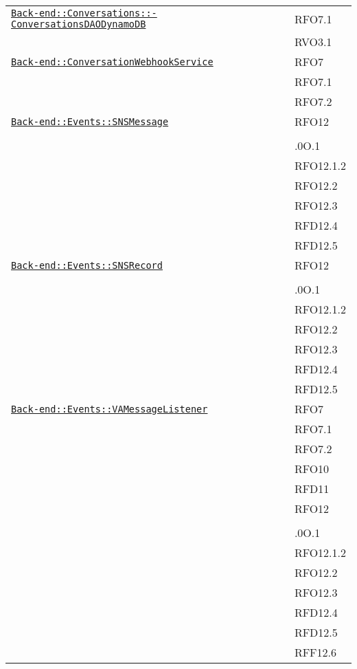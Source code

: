 \begin{longtable}{|>{\centering}m{10cm}|m{3cm}<{\centering}|}
\hyperref[Back-end::Conversations::ConversationsDAODynamoDB]{\texttt{Back-end::Conversations::-\linebreak ConversationsDAODynamoDB}} & RFO7.1\\
& RVO3.1\\ \hline

\hyperref[Back-end::ConversationWebhookService]{\texttt{Back-end::ConversationWebhookService}} & RFO7\\
& RFO7.1\\
& RFO7.2\\ \hline

\hyperref[Back-end::Events::SNSMessage]{\texttt{Back-end::Events::SNSMessage}} & RFO12\\
& \\
& .0O.1\\
& RFO12.1.2\\
& RFO12.2\\
& RFO12.3\\
& RFD12.4\\
& RFD12.5\\ \hline

\hyperref[Back-end::Events::SNSRecord]{\texttt{Back-end::Events::SNSRecord}} & RFO12\\
& \\
& .0O.1\\
& RFO12.1.2\\
& RFO12.2\\
& RFO12.3\\
& RFD12.4\\
& RFD12.5\\ \hline

\hyperref[Back-end::Events::VAMessageListener]{\texttt{Back-end::Events::VAMessageListener}} & RFO7\\
& RFO7.1\\
& RFO7.2\\
& RFO10\\
& RFD11\\
& RFO12\\
& \\
& .0O.1\\
& RFO12.1.2\\
& RFO12.2\\
& RFO12.3\\
& RFD12.4\\
& RFD12.5\\
& RFF12.6\\ \hline


\end{longtable}
